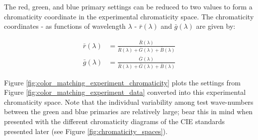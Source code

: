 \documentclass{article}
\begin{document}
\begin{multicols}{2}
The red, green, and blue primary settings can be reduced to two values to form a chromaticity coordinate in the experimental chromaticity space.  The chromaticity coordinates - as functions of wavelength $\lambda$ - $\bar{r}(\lambda)$ and $\bar{g}(\lambda)$ are given by:

\begin{equation} %
    \begin{aligned}
        \bar{r}(\lambda)&=\frac{\bar{R}(\lambda)}{\bar{R}(\lambda)+\bar{G}(\lambda)+\bar{B}(\lambda)}\\
        \bar{g}(\lambda)&=\frac{\bar{G}(\lambda)}{\bar{R}(\lambda)+\bar{G}(\lambda)+\bar{B}(\lambda)}
    \end{aligned}
\end{equation}

Figure \ref{fig:color_matching_experiment_chromaticity} plots the settings from Figure \ref{fig:color_matching_experiment_data} converted into this experimental chromaticity space.  Note that the individual variability among test wave-numbers between the green and blue primaries are relatively large; bear this in mind when presented with the different chromaticity diagrams of the CIE standards presented later (see Figure \ref{fig:chromaticity_spaces}).


\end{multicols}
\end{document}
